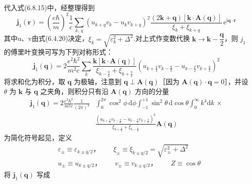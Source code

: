 代入式(6.8.15)中，经整理得到
\begin{equation}
  \boldsymbol{j}_{1}(\boldsymbol{r})
  =\left(\frac{e\hbar}{m}\right)^{2}\frac{1}{c}\sum_{k,\,q}
  \left(u_{k+q}v_{k}-u_{k}v_{k+q}\right)^{2}
  \frac{\left(2\boldsymbol{k}+\boldsymbol{q}\right)
  \left[\boldsymbol{k}\cdot\boldsymbol{A}(\boldsymbol{q})\right]}
  {\xi_{k}+\xi_{k+q}}\,\mathrm{e}^{\mathrm{i}\boldsymbol{q}\cdot\boldsymbol{r}}
\end{equation}
其中u、v由式(6.4.20)决定，$\xi_{k}=\sqrt{\varepsilon_{k}^{2}+\Delta^{2}}$.对上式作变数代换 $\boldsymbol{k}\to\boldsymbol{k}-\dfrac{\boldsymbol{q}}{2}$，则 $j_{1}$ 的傅里叶变换可写为下列对称形式：
\begin{equation}
  \boldsymbol{j}_{1}(\boldsymbol{q})
  =2\frac{e^{2}\hbar^{2}}{m^{2}c}\sum_{k}
  \frac{\boldsymbol{k}\left[\boldsymbol{k}\cdot\boldsymbol{A}(\boldsymbol{q})\right]}
  {\xi_{k-\frac{q}{2}}+\xi_{k+\frac{q}{2}}}
  \left(u_{k+\frac{q}{2}}v_{k-\frac{q}{2}}
  -u_{k-\frac{q}{2}}v_{k+\frac{q}{2}}\right)^{2}
\end{equation}
将求和化为积分，取 $\boldsymbol{q}$ 为极轴，注意到 $\boldsymbol{q}\perp\boldsymbol{A}(\boldsymbol{q})$［因为 $\boldsymbol{A}(\boldsymbol{q})\cdot\boldsymbol{q}=0$］，并设 $\theta$ 为 $\boldsymbol{k}$ 与 $\boldsymbol{q}$ 之夹角，则积分只有沿 $\boldsymbol{A}(\boldsymbol{q})$ 方向的分量
\begin{equation*}
\begin{aligned}
  \boldsymbol{j}_{1}(\boldsymbol{q})
  =2\frac{e^{2}\hbar^{2}}{m^{2}c}\frac{1}{(2\pi)^{3}}
  &\int_{0}^{2\pi}\cos^{2}\phi\,\mathrm{d}\phi
  \int_{-1}^{+1}\sin^{2}\theta\,\mathrm{d}\cos\theta
  \int_{0}^{\infty}k^{4}\mathrm{d}k\,\times\\
  &\frac{\left(u_{k+\frac{q}{2}}v_{k-\frac{q}{2}}
  -u_{k-\frac{q}{2}}v_{k+\frac{q}{2}}\right)^{2}}
  {\xi_{k+\frac{q}{2}}+\xi_{k-\frac{q}{2}}}\boldsymbol{A}(\boldsymbol{q})
\end{aligned}
\end{equation*}
为简化符号起见，定义
\begin{equation}
\begin{aligned}
  &\varepsilon_{\pm}\equiv\varepsilon_{k\pm q/2}\text{，}
  \qquad\xi_{\pm}\equiv\xi_{k\pm q/2}
  =\sqrt{\varepsilon_{\pm}^{2}+\Delta^{2}}\\
  &u_{\pm}\equiv u_{k\pm q/2}\text{，}
  \qquad v_{\pm}\equiv v_{k\pm q/2}\text{，}
  \qquad Z\equiv\cos\theta
\end{aligned}
\end{equation}
将 $\boldsymbol{j}_{1}(\boldsymbol{q})$ 写成
